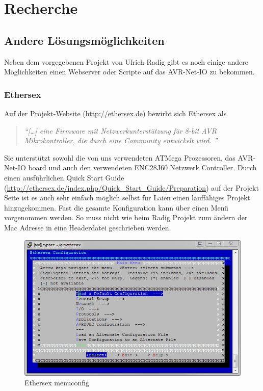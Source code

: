 \chapter{Recherche}

\section{Andere Lösungsmöglichkeiten}

Neben dem vorgegebenen Projekt von Ulrich Radig gibt es noch einige andere
Möglichkeiten einen Webserver oder Scripte auf das AVR-Net-IO zu bekommen.

\subsection{Ethersex}

Auf der Projekt-Website (\url{http://ethersex.de}) bewirbt sich Ethersex als
\begin{quote} \textit{
		\enquote{[\ldots] eine Firmware mit Netzwerkunterstützung für 8-bit AVR
		Mikrokontroller, die durch eine Community entwickelt wird.  }
	}
	\cite{Ethersex}
\end{quote}

Sie unterstützt sowohl die von uns verwendeten ATMega Prozessoren, das
AVR-Net-IO board und auch den verwendeten ENC28J60 Netzwerk Controller.
Durch einen ausführlichen Quick Start Guide
(\url{http://ethersex.de/index.php/Quick_Start_Guide/Preparation}) auf der
Projekt Seite ist es auch sehr einfach möglich selbst für Laien einen
lauffähiges Projekt hinzugekommen. Fast die gesamte Konfiguration kann
über einen Menü vorgenommen werden. So muss nicht wie beim Radig Projekt zum
ändern der Mac Adresse in eine Headerdatei geschrieben werden. 

\begin{figure}[H]
	\centering
		\includegraphics[width=13cm]{content/pictures/Recherche/Ethersex/Ehtersex1.png}
	\caption{Ethersex menuconfig}
	\label{Ethersex1}
\end{figure} 

